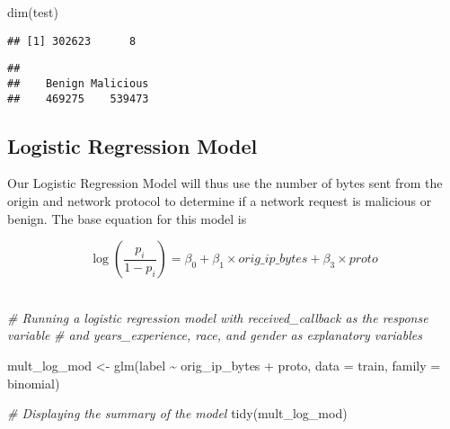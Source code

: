 \documentclass[
]{article}
\newenvironment{Shaded}{\begin{snugshade}}{\end{snugshade}}
\newcommand{\AttributeTok}[1]{\textcolor[rgb]{0.77,0.63,0.00}{#1}}
\newcommand{\CommentTok}[1]{\textcolor[rgb]{0.56,0.35,0.01}{\textit{#1}}}
\newcommand{\FunctionTok}[1]{\textcolor[rgb]{0.00,0.00,0.00}{#1}}
\newcommand{\NormalTok}[1]{#1}
\newcommand{\OtherTok}[1]{\textcolor[rgb]{0.56,0.35,0.01}{#1}}
\newcommand{\SpecialCharTok}[1]{\textcolor[rgb]{0.00,0.00,0.00}{#1}}
\begin{document}
\begin{Shaded}
\begin{Highlighting}[]
\FunctionTok{dim}\NormalTok{(test)}
\end{Highlighting}
\end{Shaded}

\begin{verbatim}
## [1] 302623      8
\end{verbatim}

\begin{Shaded}
\end{Shaded}

\begin{verbatim}
## 
##    Benign Malicious 
##    469275    539473
\end{verbatim}

\hypertarget{logistic-regression-model}{%
\subsection{Logistic Regression Model}\label{logistic-regression-model}}

Our Logistic Regression Model will thus use the number of bytes sent
from the origin and network protocol to determine if a network request
is malicious or benign. The base equation for this model is

\[
\begin{equation*}
\log\left(\frac{p_i}{1-p_i}\right) = \beta_0 + \beta_1 \times orig\_ip\_bytes + \beta_3 \times proto
\end{equation*}
\]\\

\begin{Shaded}
\begin{Highlighting}[]
\CommentTok{\# Running a logistic regression model with received\_callback as the response variable}
\CommentTok{\# and years\_experience, race, and gender as explanatory variables}

\NormalTok{mult\_log\_mod }\OtherTok{\textless{}{-}} \FunctionTok{glm}\NormalTok{(label }\SpecialCharTok{\textasciitilde{}}\NormalTok{ orig\_ip\_bytes }\SpecialCharTok{+}\NormalTok{ proto, }
                      \AttributeTok{data =}\NormalTok{ train, }
                      \AttributeTok{family =}\NormalTok{ binomial)}

\CommentTok{\# Displaying the summary of the model}
\FunctionTok{tidy}\NormalTok{(mult\_log\_mod)}
\end{Highlighting}
\end{Shaded}
\end{document}
